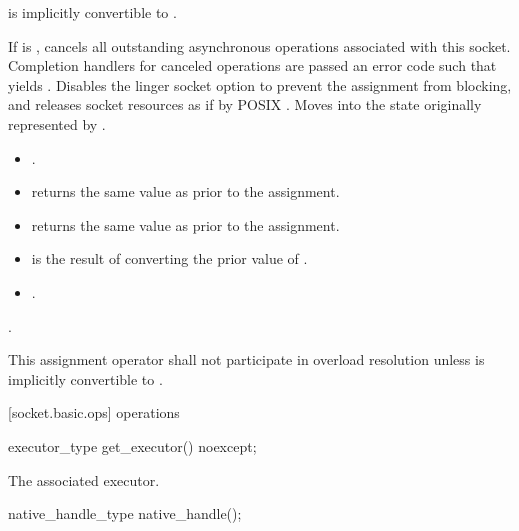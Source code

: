 \begin{itemdescr}
\pnum
\requires {} is implicitly convertible to .

\pnum
\effects If  is , cancels all outstanding asynchronous operations associated with this socket. Completion handlers for canceled operations are passed an error code  such that  yields . Disables the linger socket option to prevent the assignment from blocking, and releases socket resources as if by POSIX . Moves into  the state originally represented by .

\pnum
\postconditions
\begin{itemize}
\item
{}.
\item
{} returns the same value as  prior to the assignment.
\item
{} returns the same value as  prior to the assignment.
\item
{} is the result of converting the prior value of .
\item
{}.
\end{itemize}

\pnum
\returns {}.

\pnum
\remarks This assignment operator shall not participate in overload resolution unless  is implicitly convertible to .
\end{itemdescr}



[socket.basic.ops]{ operations}

\begin{itemdecl}
executor_type get_executor() noexcept;
\end{itemdecl}

\begin{itemdescr}
\pnum
\returns The associated executor.
\end{itemdescr}

\begin{itemdecl}
native_handle_type native_handle();
\end{itemdecl}

